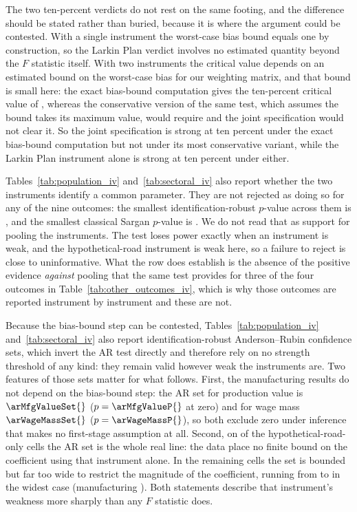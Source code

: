 The two ten-percent verdicts do not rest on the same footing, and the
difference should be stated rather than buried, because it is where the
argument could be contested. With a single instrument the worst-case
bias bound equals one by construction, so the Larkin Plan verdict
involves no estimated quantity beyond the $F$ statistic itself. With two
instruments the critical value depends on an estimated bound on the
worst-case bias for our weighting matrix, and that bound is small here:
the exact bias-bound computation gives the ten-percent critical value of
\mopCVtenBoth{}, whereas the conservative version of the same test,
which assumes the bound takes its maximum value, would require
\mopCVconsBoth{} and the joint specification would not clear it. So the
joint specification is strong at ten percent under the exact bias-bound
computation but not under its most conservative variant, while the
Larkin Plan instrument alone is strong at ten percent under either.

Tables~\ref{tab:population_iv} and~\ref{tab:sectoral_iv} also report
whether the two instruments identify a common parameter. They are not
rejected as doing so for any of the nine outcomes: the smallest
identification-robust $p$-value across them is \overidMainMinJP{}, and
the smallest classical Sargan $p$-value is \overidMainMinSarganP{}. We
do not read that as support for pooling the instruments. The test loses
power exactly when an instrument is weak, and the hypothetical-road
instrument is weak here, so a failure to reject is close to
uninformative. What the row does establish is the absence of the
positive evidence \emph{against} pooling that the same test provides for
three of the four outcomes in Table~\ref{tab:other_outcomes_iv}, which
is why those outcomes are reported instrument by instrument and these
are not.

Because the bias-bound step can be contested,
Tables~\ref{tab:population_iv}
and~\ref{tab:sectoral_iv} also report identification-robust
Anderson--Rubin confidence sets, which invert the AR test directly and
therefore rely on no strength threshold of any kind: they remain valid
however weak the instruments are. Two features of those sets matter for
what follows. First, the manufacturing results do not depend on the
bias-bound step: the AR set for production value is $\arMfgValueSet{}$
($p=\arMfgValueP{}$ at zero) and for wage mass $\arWageMassSet{}$
($p=\arWageMassP{}$), so both exclude zero under inference that makes no
first-stage assumption at all. Second, on \arHypoWholeLine{} of the
\arHypoNCells{} hypothetical-road-only cells the AR set is the whole real
line: the data place no finite bound on the coefficient using that
instrument alone. In the \arHypoBounded{} remaining cells the set is
bounded but far too wide to restrict the magnitude of the coefficient,
running from \arHypoWidestLo{} to \arHypoWidestHi{} in the widest case
(manufacturing \arHypoWidestLabel{}). Both statements describe that
instrument's weakness more sharply than any $F$ statistic does.

